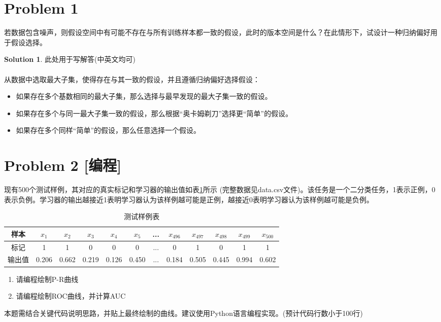 \documentclass[a4paper,UTF8]{article}
\theoremstyle{definition}
\newtheorem*{solution}{Solution}
\begin{document}
\newpage
\section*{Problem 1}
若数据包含噪声，则假设空间中有可能不存在与所有训练样本都一致的假设，此时的版本空间是什么？在此情形下，试设计一种归纳偏好用于假设选择。
\begin{solution}
此处用于写解答(中英文均可)
~\\
~\\
从数据中选取最大子集，使得存在与其一致的假设，并且遵循归纳偏好选择假设：
\begin{itemize}
\item 如果存在多个基数相同的最大子集，那么选择与最早发现的最大子集一致的假设。
\item 如果存在多个与同一最大子集一致的假设，那么根据“奥卡姆剃刀”选择更“简单”的假设。
\item 如果存在多个同样“简单”的假设，那么任意选择一个假设。
\end{itemize}
\end{solution}

\section*{Problem 2 [编程]} 
现有500个测试样例，其对应的真实标记和学习器的输出值如表\ref{table:roc}所示 (完整数据见data.csv文件)。该任务是一个二分类任务，1表示正例，0表示负例。学习器的输出越接近1表明学习器认为该样例越可能是正例，越接近0表明学习器认为该样例越可能是负例。
\begin{table}[!h]
	\centering
	\caption{测试样例表} \vspace{2mm}\label{table:roc}
	\begin{tabular}{c|c c c c c c c c c c c}\hline
		样本 & $x_1$ & $x_2$ & $x_3$  & $x_4$  & $x_5$&...& $x_{496}$& $x_{497}$ & $x_{498}$ & $x_{499}$ & $x_{500}$ \\
		\hline
		标记 & 1  & 1 &  0 &  0  & 0 &... &0& 1 & 0 & 1 & 1\\
		\hline
		输出值 & 0.206  & 0.662 &  0.219 &  0.126  & 0.450 & ... & 0.184&0.505 & 0.445 & 0.994 & 0.602\\
		\hline
	\end{tabular}
\end{table}
\begin{enumerate}[ {(}1{)}]
\item 请编程绘制P-R曲线
\item 请编程绘制ROC曲线，并计算AUC
\end{enumerate}
本题需结合关键代码说明思路，并贴上最终绘制的曲线。建议使用Python语言编程实现。(预计代码行数小于100行)
\end{document}
